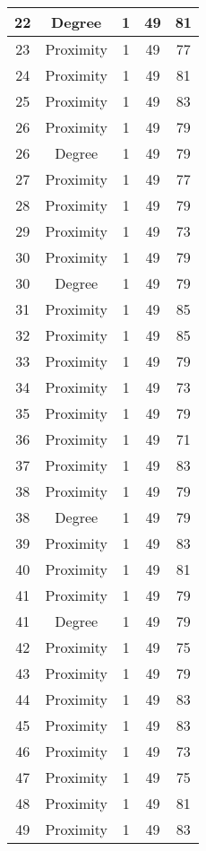 \documentclass[results.tex]{subfiles}
\begin{document}
\begin{center}
\begin{tabular}{| c || c | c | c | c |}
    \hline
    22 & Degree & 1 & 49 & 81 \\ 
    \hline
    23 & Proximity & 1 & 49 & 77 \\ 
    \hline
    24 & Proximity & 1 & 49 & 81 \\ 
    \hline
    25 & Proximity & 1 & 49 & 83 \\ 
    \hline
    26 & Proximity & 1 & 49 & 79 \\ 
    \hline
    26 & Degree & 1 & 49 & 79 \\ 
    \hline
    27 & Proximity & 1 & 49 & 77 \\ 
    \hline
    28 & Proximity & 1 & 49 & 79 \\ 
    \hline
    29 & Proximity & 1 & 49 & 73 \\ 
    \hline
    30 & Proximity & 1 & 49 & 79 \\ 
    \hline
    30 & Degree & 1 & 49 & 79 \\ 
    \hline
    31 & Proximity & 1 & 49 & 85 \\ 
    \hline
    32 & Proximity & 1 & 49 & 85 \\ 
    \hline
    33 & Proximity & 1 & 49 & 79 \\ 
    \hline
    34 & Proximity & 1 & 49 & 73 \\ 
    \hline
    35 & Proximity & 1 & 49 & 79 \\ 
    \hline
    36 & Proximity & 1 & 49 & 71 \\ 
    \hline
    37 & Proximity & 1 & 49 & 83 \\ 
    \hline
    38 & Proximity & 1 & 49 & 79 \\ 
    \hline
    38 & Degree & 1 & 49 & 79 \\ 
    \hline
    39 & Proximity & 1 & 49 & 83 \\ 
    \hline
    40 & Proximity & 1 & 49 & 81 \\ 
    \hline
    41 & Proximity & 1 & 49 & 79 \\ 
    \hline
    41 & Degree & 1 & 49 & 79 \\ 
    \hline
    42 & Proximity & 1 & 49 & 75 \\ 
    \hline
    43 & Proximity & 1 & 49 & 79 \\ 
    \hline
    44 & Proximity & 1 & 49 & 83 \\ 
    \hline
    45 & Proximity & 1 & 49 & 83 \\ 
    \hline
    46 & Proximity & 1 & 49 & 73 \\ 
    \hline
    47 & Proximity & 1 & 49 & 75 \\ 
    \hline
    48 & Proximity & 1 & 49 & 81 \\ 
    \hline
    49 & Proximity & 1 & 49 & 83 \\ 
    \hline   \end{tabular}
\end{center}
\end{document}
